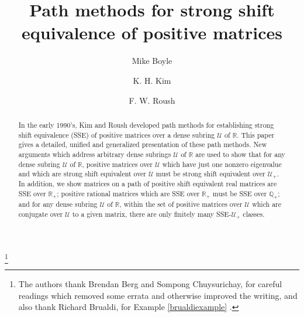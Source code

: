 \documentclass{amsart}
\theoremstyle{definition}
\theoremstyle{remark}
\numberwithin{equation}{section}
\begin{document}
\title{Path methods for strong shift equivalence
of positive matrices}
\author{Mike Boyle}
\address{Mike Boyle\\
Department of Mathematics \\
University of Maryland\\
College Park, MD 20742-4015, U.S.A.}
\author{K. H. Kim}
\address{K. H. Kim  (deceased)\\
Mathematics Research Group\\
Alabama State University, Montgomery, AL 36101-0271, U.S.A.\\
and Korean Academy of Science and Technology}
\author{F. W. Roush}
\address{F. W. Roush\\
Mathematics Research Group\\
Alabama State University, Montgomery, AL 36101-0271, U.S.A.}

\thanks{The authors thank Brendan Berg and Sompong Chuysurichay, 
for careful readings which removed some errata and otherwise 
improved the writing, and  also thank 
Richard Brualdi, for  Example \ref{brualdiexample} .} 

\date{}

 

\begin{abstract} 
In the early 1990's, Kim and Roush developed path methods 
for establishing strong shift equivalence (SSE) of positive 
matrices over a dense subring $\mathcal U$ of $\mathbb R$. 
This paper gives a detailed, unified and generalized 
presentation of these path methods.  
New arguments which address arbitrary dense subrings $\mathcal U$ 
of $\mathbb R$ are 
used to show that for any dense subring $\mathcal U$ of $\mathbb R$, 
positive matrices over $\mathcal U$ which have just 
one nonzero eigenvalue and which are strong shift equivalent over $\mathcal U$ must 
be strong shift equivalent over $\mathcal U_+$. In addition, we show 
matrices on a path of positive shift equivalent real matrices 
are SSE over $\mathbb R_+$;  positive rational matrices 
which are SSE over $\mathbb R_+$ must be 
SSE over $\mathbb Q_+$; and for any  dense subring $\mathcal U$ of 
$\mathbb R$, within the set of positive matrices over $\mathcal U$ 
which are conjugate over $\mathcal U$ to a given matrix, there 
are only finitely many SSE-$\mathcal U_+$ classes. 
\end{abstract}
\maketitle
\tableofcontents
\end{document}
